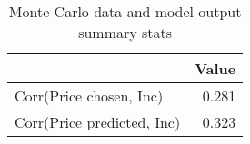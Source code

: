 \begin{table}[!ht]
	\centering
		\caption{Monte Carlo data and model output summary stats}
\begin{tabular}{lr}
		\toprule
               &     Value\\
		\midrule
		Corr(Price chosen, Inc)&     0.281\\
		Corr(Price predicted, Inc)&     0.323\\
		\bottomrule
	\end{tabular}
\end{table}

